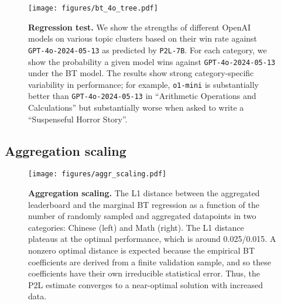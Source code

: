 \begin{figure}[t]
    \centering
    \texttt{[image: figures/bt\_4o\_tree.pdf]}
    \caption{\textbf{Regression test.} We show the strengths of different OpenAI models on various topic clusters based on their win rate against \texttt{GPT-4o-2024-05-13} as predicted by \texttt{P2L-7B}. For each category, we show the probability a given model wins against \texttt{GPT-4o-2024-05-13} under the BT model. The results show strong category-specific variability in performance; for example, \texttt{o1-mini} is substantially better than \texttt{GPT-4o-2024-05-13} in ``Arithmetic Operations and Calculations'' but substantially worse when asked to write a ``Suspenseful Horror Story''.}
    \label{fig:analysis}
\end{figure}






\subsection{Aggregation scaling}
\label{sec:aggregation-scaling}

\begin{figure}[t]
    \centering
    \texttt{[image: figures/aggr\_scaling.pdf]}
    \caption{\textbf{Aggregation scaling.} The L1 distance between the aggregated leaderboard and the marginal BT regression as a function of the number of randomly sampled and aggregated datapoints in two categories: Chinese (left) and Math (right). The L1 distance plateaus at the optimal performance, which is around 0.025/0.015.
    A nonzero optimal distance is expected because the empirical BT coefficients are derived from a finite validation sample, and so these coefficients have their own irreducible statistical error.
    Thus, the P2L estimate converges to a near-optimal solution with increased data.}
    \label{fig:aggr_scale}
    \vspace{-5.0pt}
\end{figure}

